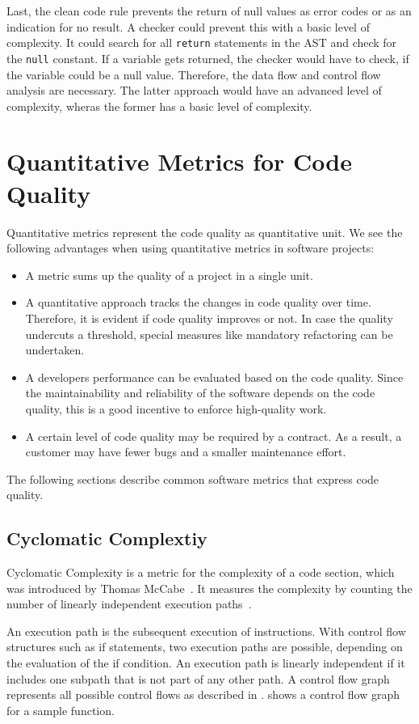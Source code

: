 Last, the clean code rule prevents the return of null values as error codes or as an indication for no result. A checker could prevent this with a basic level of complexity. It could search for all \texttt{return} statements in the AST and check for the \texttt{null} constant. If a variable gets returned, the checker would have to check, if the variable could be a null value. Therefore, the data flow and control flow analysis are necessary. The latter approach would have an advanced level of complexity, wheras the former has a basic level of complexity. 

\section{Quantitative Metrics for Code Quality}
Quantitative metrics represent the code quality as quantitative unit. We see the following advantages when using quantitative metrics in software projects:
\begin{itemize}
    \item A metric sums up the quality of a project in a single unit.
    \item A quantitative approach tracks the changes in code quality over time. Therefore, it is evident if code quality improves or not. In case the quality undercuts a threshold, special measures like mandatory refactoring can be undertaken.
    \item A developers performance can be evaluated based on the code quality. Since the maintainability and reliability of the software depends on the code quality, this is a good incentive to enforce high-quality work.
    \item A certain level of code quality may be required by a contract. As a result, a customer may have fewer bugs and a smaller maintenance effort.
\end{itemize}
The following sections describe common software metrics that express code quality.

\subsection{Cyclomatic Complextiy}\label{sec:cyclomatic_complexity}
Cyclomatic Complexity is a metric for the complexity of a code section, which was introduced by Thomas McCabe~\cite{mccabe_complexity_1976}. It measures the complexity by counting the number of linearly independent execution paths~\cite{mccabe_complexity_1976}. 

An execution path is the subsequent execution of instructions. With control flow structures such as if statements, two execution paths are possible, depending on the evaluation of the if condition. An execution path is linearly independent if it includes one subpath that is not part of any other path. A control flow graph represents all possible control flows as described in .  shows a control flow graph for a sample function.

